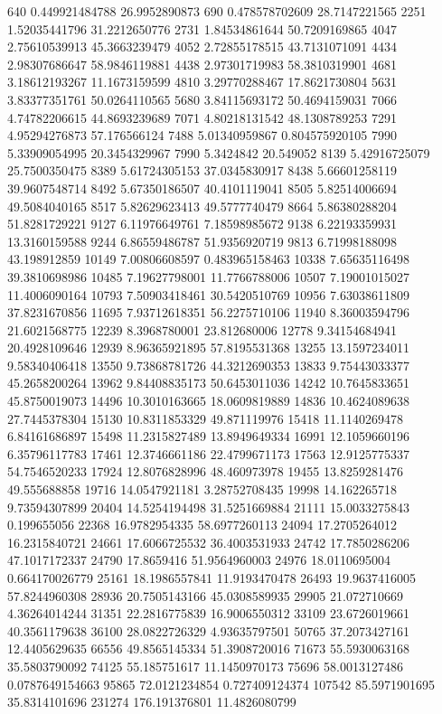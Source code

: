 640     0.449921484788  26.9952890873
690     0.478578702609  28.7147221565
2251    1.52035441796   31.2212650776
2731    1.84534861644   50.7209169865
4047    2.75610539913   45.3663239479
4052    2.72855178515   43.7131071091
4434    2.98307686647   58.9846119881
4438    2.97301719983   58.3810319901
4681    3.18612193267   11.1673159599
4810    3.29770288467   17.8621730804
5631    3.83377351761   50.0264110565
5680    3.84115693172   50.4694159031
7066    4.74782206615   44.8693239689
7071    4.80218131542   48.1308789253
7291    4.95294276873   57.176566124
7488    5.01340959867   0.804575920105
7990    5.33909054995   20.3454329967
7990    5.3424842       20.549052
8139    5.42916725079   25.7500350475
8389    5.61724305153   37.0345830917
8438    5.66601258119   39.9607548714
8492    5.67350186507   40.4101119041
8505    5.82514006694   49.5084040165
8517    5.82629623413   49.5777740479
8664    5.86380288204   51.8281729221
9127    6.11976649761   7.18598985672
9138    6.22193359931   13.3160159588
9244    6.86559486787   51.9356920719
9813    6.71998188098   43.198912859
10149   7.00806608597   0.483965158463
10338   7.65635116498   39.3810698986
10485   7.19627798001   11.7766788006
10507   7.19001015027   11.4006090164
10793   7.50903418461   30.5420510769
10956   7.63038611809   37.8231670856
11695   7.93712618351   56.2275710106
11940   8.36003594796   21.6021568775
12239   8.3968780001    23.812680006
12778   9.34154684941   20.4928109646
12939   8.96365921895   57.8195531368
13255   13.1597234011   9.58340406418
13550   9.73868781726   44.3212690353
13833   9.75443033377   45.2658200264
13962   9.84408835173   50.6453011036
14242   10.7645833651   45.8750019073
14496   10.3010163665   18.0609819889
14836   10.4624089638   27.7445378304
15130   10.8311853329   49.871119976
15418   11.1140269478   6.84161686897
15498   11.2315827489   13.8949649334
16991   12.1059660196   6.35796117783
17461   12.3746661186   22.4799671173
17563   12.9125775337   54.7546520233
17924   12.8076828996   48.460973978
19455   13.8259281476   49.555688858
19716   14.0547921181   3.28752708435
19998   14.162265718    9.73594307899
20404   14.5254194498   31.5251669884
21111   15.0033275843   0.199655056
22368   16.9782954335   58.6977260113
24094   17.2705264012   16.2315840721
24661   17.6066725532   36.4003531933
24742   17.7850286206   47.1017172337
24790   17.8659416      51.9564960003
24976   18.0110695004   0.664170026779
25161   18.1986557841   11.9193470478
26493   19.9637416005   57.8244960308
28936   20.7505143166   45.0308589935
29905   21.072710669    4.36264014244
31351   22.2816775839   16.9006550312
33109   23.6726019661   40.3561179638
36100   28.0822726329   4.93635797501
50765   37.2073427161   12.4405629635
66556   49.8565145334   51.3908720016
71673   55.5930063168   35.5803790092
74125   55.185751617    11.1450970173
75696   58.0013127486   0.0787649154663
95865   72.0121234854   0.727409124374
107542  85.5971901695   35.8314101696
231274  176.191376801   11.4826080799
